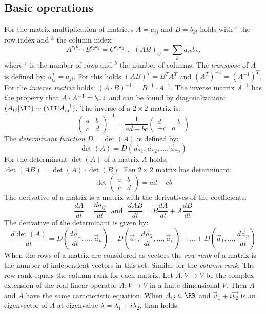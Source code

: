\subsection{Basic operations}
For the matrix multiplication of matrices $A=a_{ij}$ and $B=b_{kl}$ holds
with $^r$ the row index and $^k$ the column index:
\[
A^{r_1k_1}\cdot B^{r_2k_2}=C^{r_1k_2}~~,~~(AB)_{ij}=\sum_ka_{ik}b_{kj}
\]
where $^r$ is the number of rows and $^k$ the number of columns.
\npar
The {\it transpose} of $A$ is defined by: $a_{ij}^T=a_{ji}$.
For this holds $(AB)^T=B^TA^T$ and $(A^T)^{-1}=(A^{-1})^T$. For the
{\it inverse matrix} holds: $(A\cdot B)^{-1}=B^{-1}\cdot A^{-1}$. The inverse
matrix $A^{-1}$ has the property that $A\cdot A^{-1}=\II$ and can be found by
diagonalization: $(A_{ij}|\II)\sim(\II|A_{ij}^{-1})$.
\npar
The inverse of a $2\times2$ matrix is:
\[
\left(\begin{array}{cc}a&b\\ c&d\end{array}\right)^{-1}=\frac{1}{ad-bc}
\left(\begin{array}{cc}d&-b\\ -c&a\end{array}\right)
\]
\npar
The {\it determinant function} $D=\det(A)$ is defined by:
\[
\det(A)=D(\vec{a}_{*1},\vec{a}_{*2},...,\vec{a}_{*n})
\]
For the determinant $\det(A)$ of a matrix $A$ holds:
$\det(AB)=\det(A)\cdot\det(B)$. Een $2\times2$ matrix has determinant:
\[
\det\left(\begin{array}{cc}a&b\\ c&d \end{array}\right)=ad-cb
\]
The derivative of a matrix is a matrix with the derivatives of the coefficients:
\[
\frac{dA}{dt}=\frac{da_{ij}}{dt}~~~\mbox{and}~~~\frac{dAB}{dt}=B\frac{dA}{dt}+A\frac{dB}{dt}
\]
The derivative of the determinant is given by:
\[
\frac{d\det(A)}{dt}=D(\frac{d\vec{a}_1}{dt},...,\vec{a}_n)+
D(\vec{a}_1,\frac{d\vec{a}_2}{dt},...,\vec{a}_n)+...+D(\vec{a}_1,...,\frac{d\vec{a}_n}{dt})
\]
When the rows of a matrix are considered as vectors the {\it row rank} of a
matrix is the number of independent vectors in this set. Similar for the
{\it column rank}. The row rank equals the column rank for each matrix.
\npar
Let $\tilde{A}:\tilde{V}\rightarrow\tilde{V}$ be the complex extension of the
real linear operator $A:V\rightarrow V$ in a finite dimensional $V$.
Then $A$ and $\tilde{A}$ have the same caracteristic equation.
\npar
When $A_{ij}\in\RR$ and $\vec{v}_1+i\vec{v_2}$ is an eigenvector of $A$
at eigenvalue $\lambda=\lambda_1+i\lambda_2$, than holds:
